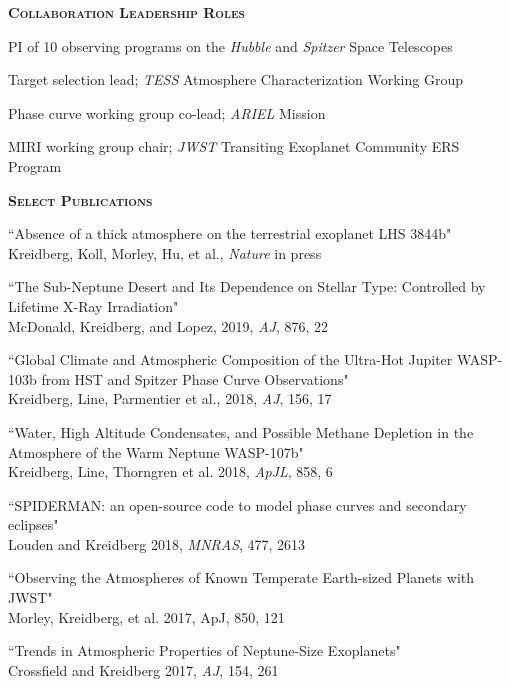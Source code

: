 \documentclass[12pt,letterpaper]{article}
\begin{document}
\textbf{\textsc{Collaboration Leadership Roles}}
\begin{compactitem}[]
\item PI of 10 observing programs on the \emph{Hubble} and \emph{Spitzer} Space Telescopes
\item Target selection lead; \emph{TESS} Atmosphere Characterization Working Group 
\item Phase curve working group co-lead; \emph{ARIEL} Mission 
\item MIRI working group chair; \emph{JWST} Transiting Exoplanet Community ERS Program
\end{compactitem}

\vspace{7mm}

\textbf{\textsc{Select Publications}} 
\begin{compactenum}
\item ``Absence of a thick atmosphere on the terrestrial exoplanet LHS 3844b"\\ 
Kreidberg, Koll, Morley, Hu, et al., \textit{Nature} in press

\item``The Sub-Neptune Desert and Its Dependence on Stellar Type: Controlled by Lifetime X-Ray Irradiation"\\
McDonald, Kreidberg, and Lopez, 2019, \textit{AJ}, 876, 22

\item ``Global Climate and Atmospheric Composition of the Ultra-Hot Jupiter WASP-103b from HST and Spitzer Phase Curve Observations"\\
Kreidberg, Line, Parmentier et al., 2018, \textit{AJ}, 156, 17


\item ``Water, High Altitude Condensates, and Possible Methane Depletion in the Atmosphere of the Warm Neptune WASP-107b"\\
Kreidberg, Line, Thorngren et al. 2018, \textit{ApJL}, 858, 6 

\item ``SPIDERMAN: an open-source code to model phase curves and secondary eclipses"\\
Louden and Kreidberg 2018, \textit{MNRAS}, 477, 2613 

\item ``Observing the Atmospheres of Known Temperate Earth-sized Planets with JWST"\\
Morley, Kreidberg, et al. 2017, ApJ, 850, 121 
    
\item ``Trends in Atmospheric Properties of Neptune-Size Exoplanets"\\
Crossfield and Kreidberg 2017, \textit{AJ}, 154, 261 


\end{compactenum}
\end{document}
